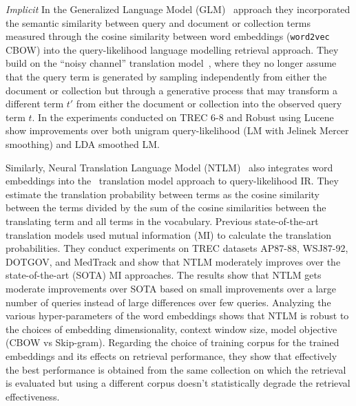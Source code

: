\textit{Implicit} In the \textsf{Generalized Language Model} (GLM)~\citep{Ganguly_GLM15} approach they incorporated the semantic similarity between query and document or collection terms measured through the cosine similarity between word embeddings (\texttt{word2vec} CBOW) into the query-likelihood language modelling retrieval approach. They build on the ``noisy channel'' translation model~\citep{Berger99}, where they no longer assume that the query term is generated by sampling independently from either the document or collection but through a generative process that may transform a different term $t'$ from either the document or collection into the observed query term $t$. In the experiments conducted on TREC 6-8 and Robust using Lucene show improvements over both unigram query-likelihood (LM with Jelinek Mercer smoothing) and LDA smoothed LM. 

Similarly, \textsf{Neural Translation Language Model} (NTLM)~\citep{Zuccon15} also integrates word embeddings into the~\cite{Berger99} translation model approach to query-likelihood IR. They estimate the translation probability between terms as the cosine similarity between the terms divided by the sum of the cosine similarities between the translating term and all terms in the vocabulary. Previous state-of-the-art translation models used mutual information (MI) to calculate the translation probabilities. They conduct experiments on TREC datasets AP87-88, WSJ87-92, DOTGOV, and MedTrack and show that NTLM moderately improves over the state-of-the-art (SOTA) MI approaches. The results show that NTLM gets moderate improvements over SOTA based on small improvements over a large number of queries instead of large differences over few queries. Analyzing the various hyper-parameters of the word embeddings shows that NTLM is robust to the choices of embedding dimensionality, context window size, model objective (CBOW vs Skip-gram). Regarding the choice of training corpus for the trained embeddings and its effects on retrieval performance, they show that effectively the best performance is obtained from the same collection on which the retrieval is evaluated but using a different corpus doesn't statistically degrade the retrieval effectiveness.

